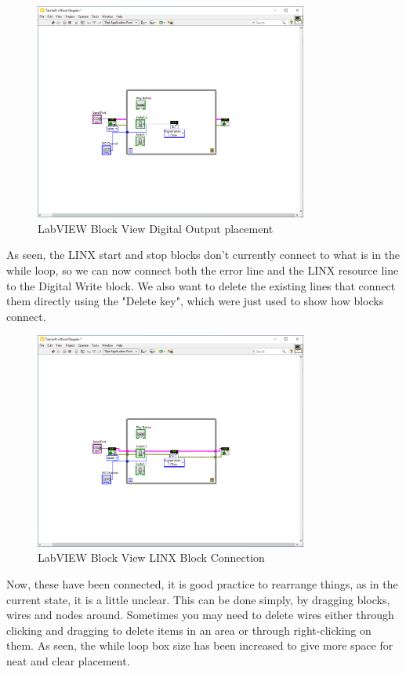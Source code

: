 \documentclass[a4paper,11pt]{report}
\begin{document}
\begin{figure}[H]
\centering
\includegraphics[width=0.8\textwidth]{screenshots/labview21}
\caption{LabVIEW Block View Digital Output placement}
\end{figure}

As seen, the LINX start and stop blocks don't currently connect to what is in the while loop, so we can now connect both the error line and the LINX resource line to the Digital Write block. We also want to delete the existing lines that connect them directly using the "Delete key", which were just used to show how blocks connect.

\begin{figure}[H]
\centering
\includegraphics[width=0.8\textwidth]{screenshots/labview22}
\caption{LabVIEW Block View LINX Block Connection}
\end{figure}

Now, these have been connected, it is good practice to rearrange things, as in the current state, it is a little unclear. This can be done simply, by dragging blocks, wires and nodes around. Sometimes you may need to delete wires either through clicking and dragging to delete items in an area or through right-clicking on them. As seen, the while loop box size has been increased to give more space for neat and clear placement.
\end{document}
